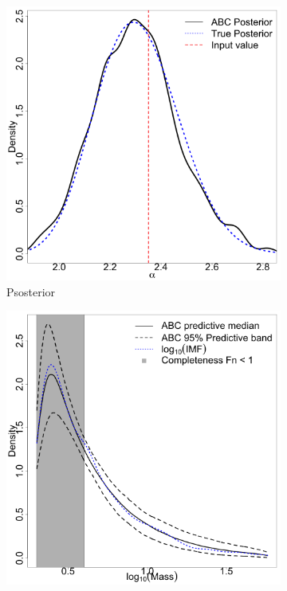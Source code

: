 \documentclass[ejs]{imsart}
\numberwithin{equation}{section}
\theoremstyle{plain}
\begin{document}
\begin{figure}[htbp]
\begin{subfigure}{0.32\textwidth}
\centering
\includegraphics[width=\textwidth]{figures/basic_1_1000_alpha.png}
\caption{Psosterior}\label{subfig:basic_alpha}
\end{subfigure}
\begin{subfigure}{0.32\textwidth}
\centering
\includegraphics[width=\textwidth]{figures/basic_1_1000_predictive_imf.png}

\end{subfigure}
\end{figure}
\end{document}
